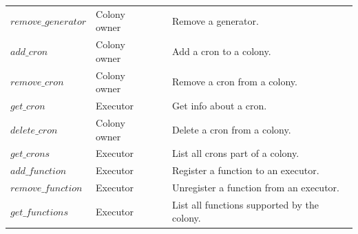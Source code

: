 \documentclass{article}
\begin{document}
\begin{table}[h]
\begin{tabular}{llcl}
        \(remove\_generator\)      & Colony owner &            & Remove a generator. \\
        \(add\_cron\)              & Colony owner &            & Add a cron to a colony.\\
        \(remove\_cron\)           & Colony owner &            & Remove a cron from a colony.\\
        \(get\_cron\)              & Executor     &            & Get info about a cron. \\
        \(delete\_cron\)           & Colony owner &            & Delete a cron from a colony.\\
        \(get\_crons\)             & Executor     &            & List all crons part of a colony.\\
        \(add\_function\)          & Executor     &            & Register a function to an executor. \\
        \(remove\_function\)       & Executor     &            & Unregister a function from an executor. \\
        \(get\_functions\)         & Executor     &            & List all functions supported by the colony. \\
		\bottomrule
	\end{tabular}
	\label{optable}
\end{table}
\end{document}
